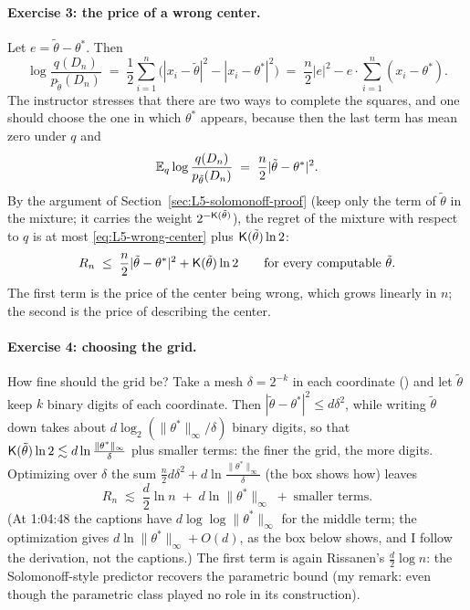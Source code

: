 \paragraph{Exercise 3: the price of a wrong center.}
Let $e=\tilde\theta-\theta^*$. Then
\[
  \log\frac{q(D_n)}{p_{\tilde\theta}(D_n)}\;=\;\frac12\sum_{i=1}^n\big(|x_i-\tilde\theta|^2-|x_i-\theta^*|^2\big)\;=\;\frac n2|e|^2-e\cdot\sum_{i=1}^n(x_i-\theta^*).
\]
The instructor stresses that there are two ways to complete the squares, and one should choose the one in which $\theta^*$ appears, because then the last term has mean zero under $q$ and
\begin{equation}\label{eq:L5-wrong-center}
  \mathbb{E}_q\log\frac{q(D_n)}{p_{\tilde\theta}(D_n)}\;=\;\frac n2|\tilde\theta-\theta^*|^2 .
\end{equation}
By the argument of Section~\ref{sec:L5-solomonoff-proof} (keep only the term of $\tilde\theta$ in the mixture; it carries the weight $2^{-\mathsf{K}(\tilde\theta)}$), the regret of the mixture with respect to $q$ is at most \eqref{eq:L5-wrong-center} plus $\mathsf{K}(\tilde\theta)\ln2$:
\begin{equation}\label{eq:L5-oracle}
  R_n\;\le\;\frac n2|\tilde\theta-\theta^*|^2+\mathsf{K}(\tilde\theta)\ln2\qquad\text{for every computable }\tilde\theta .
\end{equation}
The first term is the price of the center being wrong, which grows linearly in $n$; the second is the price of describing the center.

\paragraph{Exercise 4: choosing the grid.}
How fine should the grid be? Take a mesh $\delta=2^{-k}$ in each coordinate () and let $\tilde\theta$ keep $k$ binary digits of each coordinate. Then $|\tilde\theta-\theta^*|^2\le d\delta^2$, while writing $\tilde\theta$ down takes about $d\log_2(\|\theta^*\|_\infty/\delta)$ binary digits, so that $\mathsf{K}(\tilde\theta)\ln2\lesssim d\ln\frac{\|\theta^*\|_\infty}\delta$ plus smaller terms: the finer the grid, the more digits. Optimizing over $\delta$ the sum $\frac n2d\delta^2+d\ln\frac{\|\theta^*\|_\infty}\delta$ (the box shows how) leaves
\begin{equation}\label{eq:L5-solo-gauss}
  R_n\;\lesssim\;\frac d2\ln n\;+\;d\ln\|\theta^*\|_\infty\;+\;\text{smaller terms.}
\end{equation}
(At 1:04:48 the captions have $d\log\log\|\theta^*\|_\infty$ for the middle term\flag{}; the optimization gives $d\ln\|\theta^*\|_\infty+O(d)$, as the box below shows, and I follow the derivation, not the captions.) The first term is again Rissanen's $\frac d2\log n$: the Solomonoff-style predictor recovers the parametric bound (my remark: even though the parametric class played no role in its construction).

